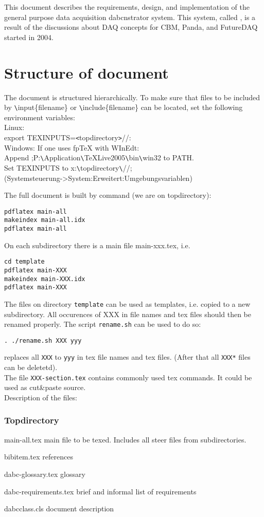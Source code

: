 
This document describes the requirements, design, and implementation of the
general purpose data acquisition dabcnstrator system.
This system, called {\DDA}, is a result of the discussions about DAQ concepts for CBM,
Panda, and FutureDAQ started in 2004.

\section{Structure of document}
The document is structured hierarchically. To make sure that files
to be included by \verb+\+input\{filename\} or \verb+\+include\{filename\}
can be located, set the following environment variables:\\
Linux:\\
export TEXINPUTS=\verb+<+topdirectory\verb+>+//:\\
Windows: If one uses fpTeX with WInEdt:\\
Append ;P:\verb+\+Application\verb+\+TeXLive2005\verb+\+bin\verb+\+win32 to PATH.\\
Set TEXINPUTS to x:\verb+\+topdirectory\verb+\+//;\\
(Systemsteuerung->System:Erweitert:Umgebungsvariablen)

The full document is built by command (we are on topdirectory):
\begin{verbatim}
pdflatex main-all
makeindex main-all.idx
pdflatex main-all
\end{verbatim}
On each subdirectory there is a main file main-xxx.tex, i.e.
\begin{verbatim}
cd template
pdflatex main-XXX
makeindex main-XXX.idx
pdflatex main-XXX
\end{verbatim}
The files on directory {\tt template} can be used as templates, i.e. copied to a new subdirectory.
All occurences of XXX in file names and tex files should then be renamed properly.
The script {\tt rename.sh} can be used to do so:
\begin{verbatim}
. ./rename.sh XXX yyy
\end{verbatim}
replaces all {\tt XXX} to {\tt yyy} in tex file names and tex files.
(After that all {\tt *XXX*} files can be deletetd).\\
The file {\tt XXX-section.tex} contains commonly used tex commands.
It could be used as cut\&paste source.\\
Description of the files:
\subsubsection{Topdirectory}
\begin{compactdesc}
\item[main-all.tex] main file to be texed. Includes all steer files from subdirectories.
\item[bibitem.tex] references
\item[dabc-glossary.tex] glossary
\item[dabc-requirements.tex] brief and informal list of requirements
\item[dabcclass.cls] document description
\end{compactdesc}
